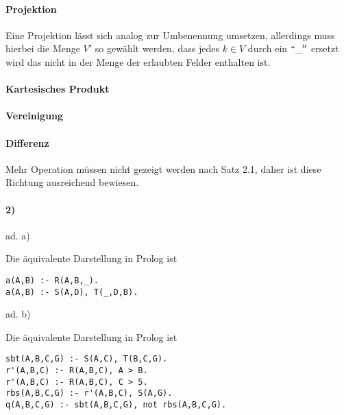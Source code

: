 \documentclass[12pt,a4paper]{amsart}
\begin{document}
\begin{aufgabe1}
\paragraph{Projektion}
Eine Projektion lässt sich analog zur Umbenennung umsetzen, allerdings muss hierbei die Menge $V'$ so gewählt werden, dass jedes $k \in V$ durch ein $``\_''$ ersetzt wird das nicht in der Menge der erlaubten Felder enthalten ist.

\paragraph{Kartesisches Produkt}
\paragraph{Vereinigung}
\paragraph{Differenz}

Mehr Operation müssen nicht gezeigt werden nach Satz 2.1, daher ist diese Richtung ausreichend bewiesen.

\paragraph{2)}

\end{aufgabe1}


\begin{aufgabe1}
ad. a)

Die äquivalente Darstellung in Prolog ist

\begin{lstlisting}
a(A,B) :- R(A,B,_).
a(A,B) :- S(A,D), T(_,D,B).
\end{lstlisting}

ad. b)

Die äquivalente Darstellung in Prolog ist


\begin{lstlisting}
sbt(A,B,C,G) :- S(A,C), T(B,C,G).
r'(A,B,C) :- R(A,B,C), A > B.
r'(A,B,C) :- R(A,B,C), C > 5.
rbs(A,B,C,G) :- r'(A,B,C), S(A,G).
q(A,B,C,G) :- sbt(A,B,C,G), not rbs(A,B,C,G).
\end{lstlisting}
\end{aufgabe1}

\begin{aufgabe1}
\end{aufgabe1}
\end{document}
